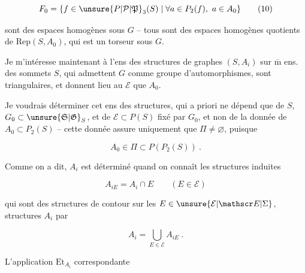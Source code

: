 \[
 F_0=\{f\in\unsure{P|\mathcal P|\mathfrak P}_3(S)\mid\forall a\in P_2(f),\ a\in A_0\} \tag*{(10)}
\]

sont des espaces homogènes sous $G$ -- tous sont
des espaces homogènes quotients de $\mathrm{Rep}(S,A_0)$,
qui est un torseur sous $G$.

Je m'intéresse maintenant à l'ens des
structures de graphes $(S,A_i)$ sur  $\overline{\mathrm m}$ ens. des
sommets $S$, qui admettent $G$ comme groupe
d'automorphismes, sont triangulaires, et donnent
lieu au $\mathcal E$ que $A_0$. 

Je voudrais déterminer cet ens  des structures,
qui a priori ne dépend que de $S$, $G_0\subset\unsure{\mathfrak S|\mathfrak G}_S$,
et de $\mathcal E\subset P(S)$  fixé par $G_0$, et non
de  la donnée de $A_0\subset P_2(S)$ -- cette
donnée assure uniquement que $\Pi\ne\varnothing$, puisque

\[
 A_0\in\Pi\subset P(P_2(S))\ . \tag*{(11)}
\]

Comme on a dit,  $A_i$ est déterminé quand on
connaît les structures induites

\[
 A_{iE}=A_i\cap E\qquad(E\in\mathcal E) \tag*{(12)}
\]


qui sont des structures de contour sur les
$E\in\unsure{\mathcal E|\mathscr E|\Sigma}$,  structures  $A_i$ par

\[
 A_i=\bigcup_{E\in\mathcal E}A_{iE}\ . \tag*{(13)}
\]

L'application $\mathrm{Et}_{A_i}$ correspondante


